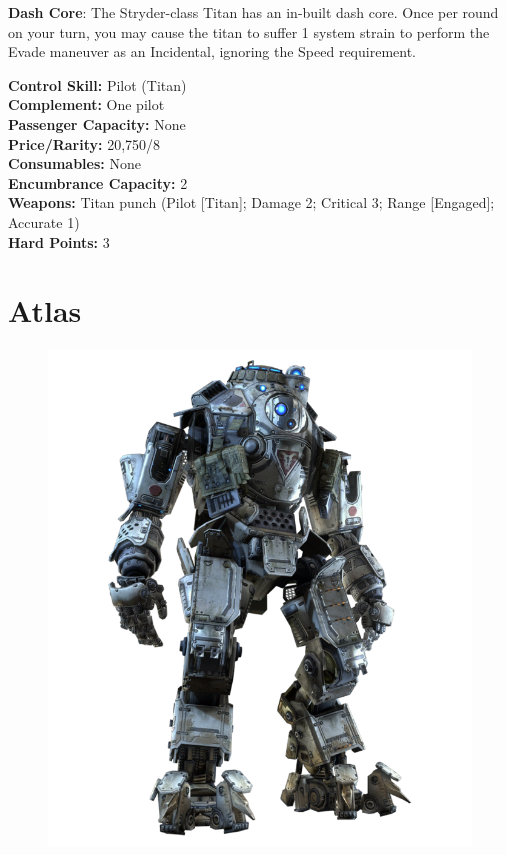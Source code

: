 \documentclass[9pt, openany]{extbook}
\begin{document}
\textbf{Dash Core}: The Stryder-class Titan has an in-built dash core. Once per round on your turn, you may cause the titan to suffer 1 system strain to perform the Evade maneuver as an Incidental, ignoring the Speed requirement.

\vspace{2em}


\begin{multicols}{2}
\noindent\textbf{Control Skill:} Pilot (Titan)\\
\noindent\textbf{Complement:} One pilot\\
\noindent\textbf{Passenger Capacity:} None\\
\noindent\textbf{Price/Rarity:} 20,750/8\\
\noindent\textbf{Consumables:} None\\
\noindent\textbf{Encumbrance Capacity:} 2\\
\noindent\textbf{Weapons:} Titan punch (Pilot [Titan]; Damage 2; Critical 3; Range [Engaged]; Accurate 1)\\
\noindent\textbf{Hard Points:} 3
\end{multicols}

\section{Atlas}
\label{sec:atlas}
\begin{figure}
\includegraphics[width=\linewidth]{Atlas}
\end{figure}
\end{document}
